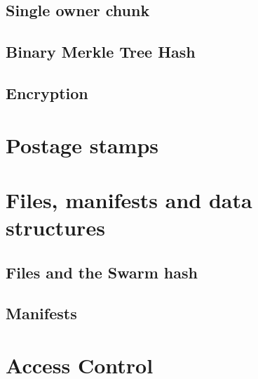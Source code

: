 \subsection{Single owner chunk \statusgreen}\label{spec:format:soc}

\subsection{Binary Merkle Tree Hash \statusyellow}\label{spec:format:bmt}

\subsection{Encryption \statusyellow}\label{spec:format:encryption}


\section{Postage stamps \statusorange}\label{spec:format:postage-stamps}



\section{Files, manifests and data structures\statusyellow}\label{spec:format:data-structures}
\subsection{Files and the Swarm hash \statusyellow}\label{spec:format:files}

\subsection{Manifests \statusyellow}\label{spec:format:manifests}

%


\section{Access Control \statusgreen}\label{spec:format:access-control}


